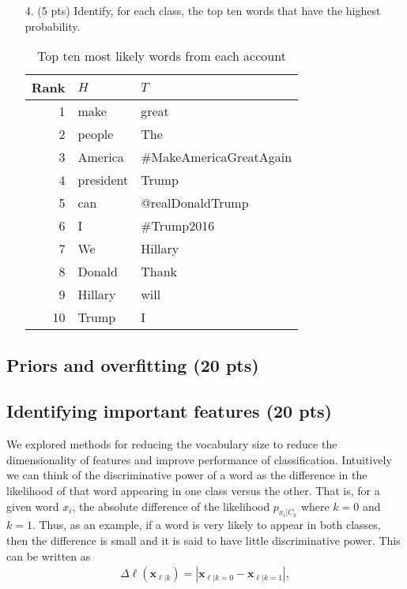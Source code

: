 \documentclass{article}
\renewcommand{\vec}[1]{\mathbf{#1}}
\begin{document}
\begin{enumerate}
\item [4.] (5 pts) Identify, for each class, the top ten words that have the highest probability.

\begin{table}[!htb]
\centering
\caption{Top ten most likely words from each account}
\begin{tabular}{|r|l|l|} \hline
	Rank & $H$ & $T$ \\ \hline
	1 & make & great \\ \hline
	2 & people & The \\ \hline
	3 & America &  \#MakeAmericaGreatAgain \\ \hline
	4 & president & Trump \\ \hline
	5 & can & @realDonaldTrump \\ \hline
	6 & I & \#Trump2016 \\ \hline
	7 & We & Hillary \\ \hline
	8 & Donald & Thank \\ \hline
	9 & Hillary & will \\ \hline
	10 & Trump & I \\ \hline
\end{tabular}
\end{table}




\end{enumerate}

\subsection{Priors and overfitting (20 pts)}

\subsection{Identifying important features (20 pts)}

We explored methods for reducing the vocabulary size to reduce the dimensionality of features and improve performance of classification.  Intuitively we can think of the discriminative power of a word as the difference in the likelihood of that word appearing in one class versus the other. That is, for a given word $x_i$, the absolute difference of the likelihood $p_{x_i|C_k}$ where $k=0$ and $k=1$. Thus, as an example, if a word is very likely to appear in both classes, then the difference is small and it is said to have little discriminative power. This can be written as
\begin{align}
\Delta \ell(\vec{x}_{\ell|k}) = |\vec{x}_{\ell|k=0} - \vec{x}_{\ell|k=1}|,
\end{align}
\end{document}
